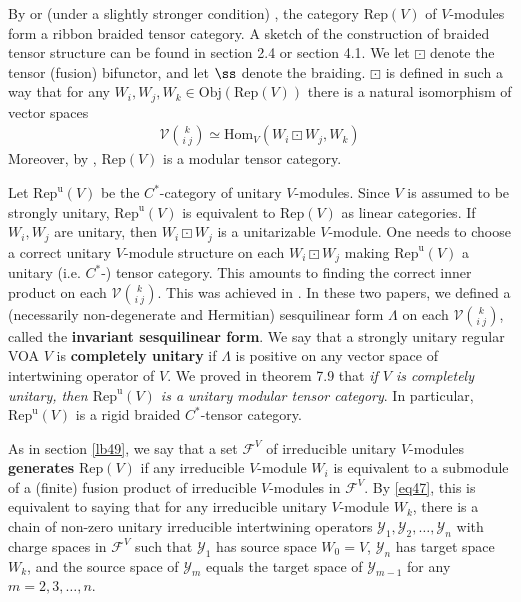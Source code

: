 \documentclass[12pt,a4paper]{article}
\theoremstyle{definition}
\theoremstyle{plain}
\newcommand{\mc}{\mathcal}
\newcommand{\Hom}{\mathrm{Hom}}
\newcommand{\Rep}{\mathrm{Rep}}
\newcommand{\RepV}{\mathrm{Rep}(V)}
\newcommand{\RepuV}{\mathrm{Rep}^{\mathrm u}(V)}
\newcommand{\Obj}{\mathrm{Obj}}
\numberwithin{equation}{subsection}
\begin{document}
By \cite{HL95a,HL95b,HL95c,Hua95,Hua05a} or (under a slightly stronger condition) \cite{NT05}, the category $\Rep(V)$ of  $V$-modules form a  ribbon braided tensor category. A sketch of the construction of braided tensor structure can be found in \cite{Gui19a} section 2.4 or \cite{Gui21a} section 4.1.  We let $\boxdot$ denote the tensor (fusion) bifunctor, and let $\ss$ denote the braiding. $\boxdot$ is defined in such a way that for any $W_i,W_j,W_k\in\Obj(\Rep(V))$ there is a natural isomorphism of vector spaces
\begin{align}
\mc V{k\choose i~j}\simeq\Hom_V(W_i\boxdot W_j,W_k)\label{eq47}
\end{align}
Moreover, by \cite{Hua05b,Hua08a,Hua08b}, $\Rep(V)$ is a modular tensor category. 

Let $\RepuV$ be the $C^*$-category of unitary $V$-modules. Since $V$ is assumed to be strongly unitary, $\RepuV$ is equivalent to $\RepV$ as linear categories. If $W_i,W_j$ are unitary, then $W_i\boxdot W_j$ is a unitarizable $V$-module. One needs to choose a correct unitary $V$-module structure on each $W_i\boxdot W_j$  making $\RepuV$ a unitary (i.e. $C^*$-) tensor category. This amounts to finding the correct inner product on each $\mc V{k\choose i~j}$. This was achieved in \cite{Gui19a,Gui19b}. In these two papers, we defined a (necessarily non-degenerate and Hermitian) sesquilinear form $\Lambda$ on each $\mc V{k\choose i~j}$, called the \textbf{invariant sesquilinear form}. We say that a strongly unitary regular VOA $V$ is \textbf{completely unitary} if $\Lambda$ is positive on any vector space of intertwining operator of $V$. We proved in \cite{Gui19b} theorem 7.9 that \emph{if $V$ is completely unitary, then $\RepuV$ is a unitary modular tensor category}. In particular, $\RepuV$ is a rigid braided $C^*$-tensor category. 

As in section \ref{lb49}, we say that a set $\mc F^V$ of irreducible unitary $V$-modules  \textbf{generates} $\RepV$ if any irreducible $V$-module $W_i$ is equivalent to a submodule of a (finite) fusion product of irreducible $V$-modules in $\mc F^V$. By \eqref{eq47}, this is equivalent to saying that for any irreducible unitary $V$-module $W_k$, there is a chain of non-zero unitary irreducible intertwining operators $\mc Y_1,\mc Y_2,\dots,\mc Y_n$ with charge spaces in $\mc F^V$ such that $\mc Y_1$ has source space $W_0=V$, $\mc Y_n$ has target space $W_k$, and the source space of $\mc Y_m$ equals the target space of $\mc Y_{m-1}$ for any $m=2,3,\dots,n$.
\end{document}
